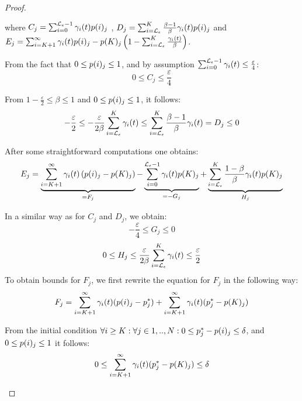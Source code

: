 \documentclass{entcs}
\begin{document}
{\begin{proof}
\begin{enumerate}
						where $C_{j} = \sum_{i=0}^{\mathcal{L}_{\epsilon}-1} \gamma_{i}(t) p(i)_{j}$ , $D_{j} = \sum_{i=\mathcal{L}_{\epsilon}}^{K} \frac{\beta - 1}{\beta} \gamma_{i}(t) p(i)_{j} $ and $E_{j} = \sum_{i=K+1}^{\infty}\gamma_{i}(t) p(i)_{j} - p(K)_{j} \left(1 - \sum_{i=\mathcal{L}_{\epsilon}}^{K}\frac{\gamma_{i}(t)}{\beta} \right)$.
						
						From the fact that $0 \leq p(i)_{j} \leq 1$, and by assumption $\sum_{i=0}^{\mathcal{L}_{\epsilon}-1} \gamma_{i}(t) \leq \frac{\varepsilon}{4}$:
						\begin{equation}
							0 \leq C_{j} \leq \frac{\varepsilon}{4} \nonumber
						\end{equation}
						
						From $1- \frac{\varepsilon}{2} \leq \beta \leq 1$ and $0 \leq p(i)_{j} \leq 1$, it follows:
						\begin{equation}
							- \frac{\varepsilon}{2} \leq - \frac{\varepsilon}{2 \beta} \sum_{i=\mathcal{L}_{\epsilon}}^{K} \gamma_{i}(t) \leq \sum_{i=\mathcal{L}_{\epsilon}}^{K} \frac{\beta - 1}{\beta} \gamma_{i}(t) = D_{j} \leq 0 \nonumber
						\end{equation}
						
						After some straightforward computations one obtains:
						\begin{equation}
							E_{j} = \underbrace{\sum_{i=K+1}^{\infty}\gamma_{i}(t) \left( p(i)_{j} - p(K)_{j} \right)}_{=F_{j}} - \underbrace{\sum_{i=0}^{\mathcal{L}_{\epsilon}-1}\gamma_{i}(t) p(K)_{j}}_{=-G_{j}} + \underbrace{\sum_{i=\mathcal{L}_{\epsilon}}^{K}\frac{1- \beta}{\beta} \gamma_{i}(t) p(K)_{j}}_{H_{j}} \label{eq:c_init}
						\end{equation}
	
						In a similar way as for $C_{j}$ and $D_{j}$, we obtain:
						\begin{equation}
							- \frac{\varepsilon}{4} \leq G_{j} \leq 0 \nonumber
						\end{equation}
						\begin{equation}
							0 \leq H_{j} \leq \frac{\varepsilon}{2 \beta} \sum_{i=\mathcal{L}_{\epsilon}}^{K} \gamma_{i}(t) \leq \frac{\varepsilon}{2} \nonumber
						\end{equation}
							To obtain bounds for $F_{j}$, we first rewrite the equation for $F_{j}$ in the following way: 
						\begin{equation}
								F_{j} = \sum_{i=K+1}^{\infty}\gamma_{i}(t) (p(i)_{j} - p^{*}_{j}) + \sum_{i=K+1}^{\infty} \gamma_{i}(t) (p^{*}_{j} - p(K)_{j}) \nonumber
						\end{equation}
	
						From the initial condition $\forall i \geq K : \forall j \in 1,..,N : 0 \leq p^{*}_{j} - p(i)_{j} \leq \delta$, and $0 \leq p(i)_{j} \leq 1$ it follows:
						\begin{equation}
								0 \leq \sum_{i=K+1}^{\infty} \gamma_{i}(t) (p^{*}_{j} - p(K)_{j}) \leq \delta \nonumber
						\end{equation}
	

\end{enumerate}
\end{proof}}
\end{document}
